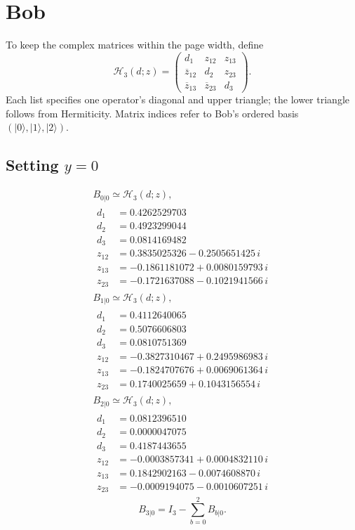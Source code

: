 \documentclass[11pt]{article}
\begin{document}
\section{Bob}
To keep the complex matrices within the page width, define
\[
\mathcal H_3(d;z)=
\begin{pmatrix}
d_1&z_{12}&z_{13}\\
\overline z_{12}&d_2&z_{23}\\
\overline z_{13}&\overline z_{23}&d_3
\end{pmatrix}.
\]
Each list specifies one operator's diagonal and upper triangle; the lower
triangle follows from Hermiticity. Matrix indices refer to Bob's ordered
basis $(|0\rangle,|1\rangle,|2\rangle)$.
\subsection*{Setting $y=0$}
\[
\begin{gathered}
B_{0|0}\simeq\mathcal H_3(d;z),\\[3pt]
\begin{aligned}
d_1&=0.4262529703 \\
d_2&=0.4923299044 \\
d_3&=0.0814169482 \\
z_{12}&=0.3835025326-0.2505651425\,i \\
z_{13}&=-0.1861181072+0.0080159793\,i \\
z_{23}&=-0.1721637088-0.1021941566\,i
\end{aligned}
\end{gathered}
\]
\[
\begin{gathered}
B_{1|0}\simeq\mathcal H_3(d;z),\\[3pt]
\begin{aligned}
d_1&=0.4112640065 \\
d_2&=0.5076606803 \\
d_3&=0.0810751369 \\
z_{12}&=-0.3827310467+0.2495986983\,i \\
z_{13}&=-0.1824707676+0.0069061364\,i \\
z_{23}&=0.1740025659+0.1043156554\,i
\end{aligned}
\end{gathered}
\]
\[
\begin{gathered}
B_{2|0}\simeq\mathcal H_3(d;z),\\[3pt]
\begin{aligned}
d_1&=0.0812396510 \\
d_2&=0.0000047075 \\
d_3&=0.4187443655 \\
z_{12}&=-0.0003857341+0.0004832110\,i \\
z_{13}&=0.1842902163-0.0074608870\,i \\
z_{23}&=-0.0009194075-0.0010607251\,i
\end{aligned}
\end{gathered}
\]
\[
B_{3|0}=I_3-\sum_{b=0}^2 B_{b|0}.
\]
\end{document}
